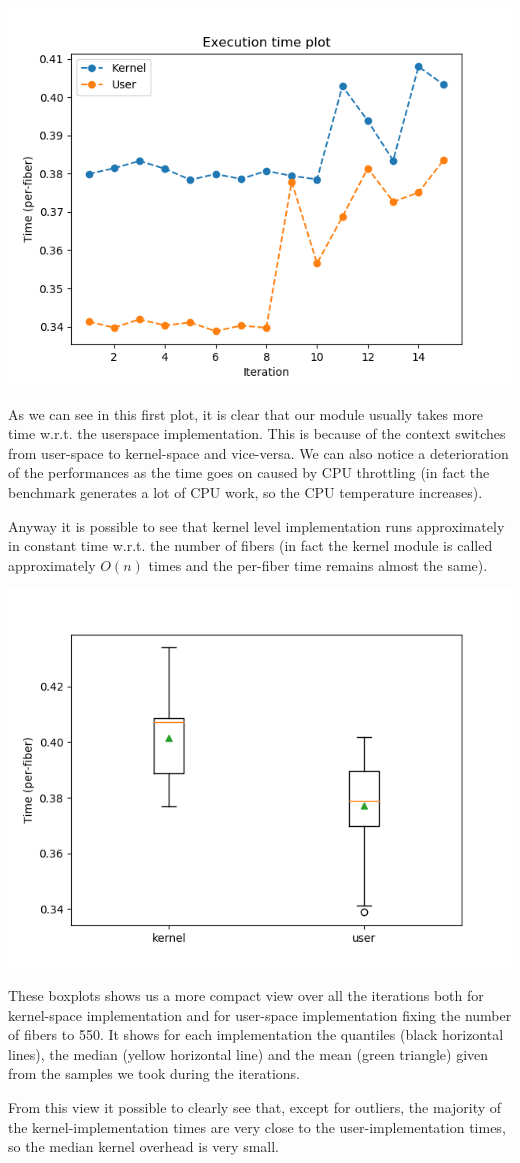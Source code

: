 \documentclass[a4paper]{article}
\begin{document}
\includegraphics[scale=0.8]{../perf/user-kernel}

As we can see in this first plot, it is clear that our module usually takes more time w.r.t. the userspace implementation. This is because of the context switches from user-space to kernel-space and vice-versa. We can also notice a deterioration of the performances as the time goes on caused by CPU throttling (in fact the benchmark generates a lot of CPU work, so the CPU temperature increases).

Anyway it is possible to see that kernel level implementation runs approximately in constant time w.r.t. the number of fibers (in fact the kernel module is called approximately $O(n)$ times and the per-fiber time remains almost the same).


\includegraphics[scale=0.8]{../perf/boxplots}

These boxplots shows us a more compact view over all the iterations both for kernel-space implementation and for user-space implementation fixing the number of fibers to 550.
It shows for each implementation the quantiles (black horizontal lines), the median (yellow horizontal line) and the mean (green triangle) given from the samples we took during the iterations.

From this view it possible to clearly see that, except for outliers, the majority of the kernel-implementation times are very close to the user-implementation times, so the median kernel overhead is very small.
\end{document}
